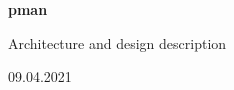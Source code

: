 {
    \fancyhf{}
    \renewcommand{\headrulewidth}{0.4pt}
    \renewcommand{\footrulewidth}{0pt}
}

\begin{titlepage}
    \thispagestyle{firststyle}

    \begin{flushleft}
        \vspace*{10cm}

        {\huge \huge \textbf{pman}}

        \vspace{0.5cm}
        {\large Architecture and design description}

        \vfill

        \vspace{0.8cm}

        {\large 09.04.2021}
    \end{flushleft}

\end{titlepage}
